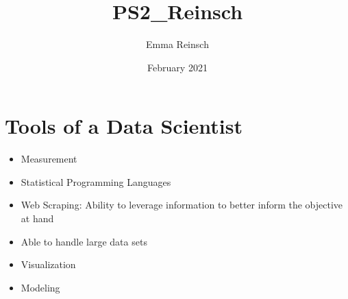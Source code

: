 \documentclass{article}
\title{PS2_Reinsch}
\author{Emma Reinsch}
\date{February 2021}
\begin{document}
\maketitle

\section{Tools of a Data Scientist}
\begin{itemize}
    \item Measurement
    \item Statistical Programming Languages
    \item Web Scraping: Ability to leverage information to better inform the objective at hand
    \item Able to handle large data sets
    \item Visualization
    \item Modeling 
\end{itemize}
\end{document}
